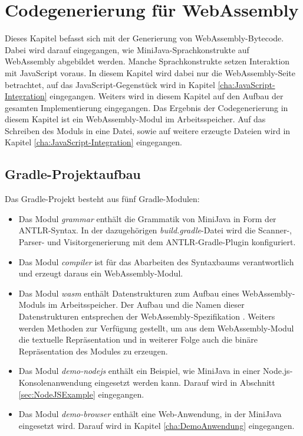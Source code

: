 \chapter{Codegenerierung für WebAssembly}

Dieses Kapitel befasst sich mit der Generierung von WebAssembly-Bytecode. Dabei wird darauf eingegangen, wie MiniJava-Sprachkonstrukte auf WebAssembly abgebildet werden. Manche Sprachkonstrukte setzen Interaktion mit JavaScript voraus. In diesem Kapitel wird dabei nur die WebAssembly-Seite betrachtet, auf das JavaScript-Gegenstück wird in Kapitel \ref{cha:JavaScript-Integration} eingegangen. Weiters wird in diesem Kapitel auf den Aufbau der gesamten Implementierung eingegangen. Das Ergebnis der Codegenerierung in diesem Kapitel ist ein WebAssembly-Modul im Arbeitsspeicher. Auf das Schreiben des Moduls in eine Datei, sowie auf weitere erzeugte Dateien wird in Kapitel \ref{cha:JavaScript-Integration} eingegangen.

\section{Gradle-Projektaufbau}

Das Gradle-Projekt besteht aus fünf Gradle-Modulen:
\begin{itemize}
    \item Das Modul \emph{grammar} enthält die Grammatik von MiniJava in Form der ANTLR-Syntax. In der dazugehörigen \emph{build.gradle}-Datei wird die Scanner-, Parser- und Visitorgenerierung mit dem ANTLR-Gradle-Plugin konfiguriert.
    \item Das Modul \emph{compiler} ist für das Abarbeiten des Syntaxbaums verantwortlich und erzeugt daraus ein WebAssembly-Modul.
    \item Das Modul \emph{wasm} enthält Datenstrukturen zum Aufbau eines Web\-As\-sem\-bly-Mo\-duls im Arbeitsspeicher. Der Aufbau und die Namen dieser Datenstrukturen entsprechen der WebAssembly-Spezifikation \cite{WebAssemblySpecification}. Weiters werden Methoden zur Verfügung gestellt, um aus dem WebAssembly-Modul die textuelle Repräsentation und in weiterer Folge auch die binäre Repräsentation des Modules zu erzeugen.
    \item Das Modul \emph{demo-nodejs} enthält ein Beispiel, wie MiniJava in einer Node.js-Kon\-so\-len\-anwendung eingesetzt werden kann. Darauf wird in Abschnitt \ref{sec:NodeJSExample} eingegangen.
    \item Das Modul \emph{demo-browser} enthält eine Web-Anwendung, in der MiniJava eingesetzt wird. Darauf wird in Kapitel \ref{cha:DemoAnwendung} eingegangen.
\end{itemize}

